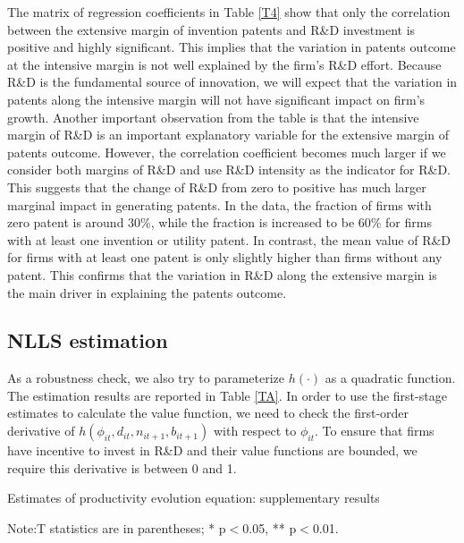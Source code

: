 \documentclass[English]{article}
\begin{document}
The matrix of regression coefficients in Table \ref{T4} show that only the correlation between the extensive margin of invention patents and R\&D investment is positive and highly significant. This implies that the variation in patents outcome at the intensive margin is not well explained by the firm's R\&D effort. Because R\&D is the fundamental source of innovation, we will expect that the variation in patents along the intensive margin will not have significant impact on firm's growth. Another important observation from the table is that the intensive margin of R\&D is an important explanatory variable for the extensive margin of patents outcome. However, the correlation coefficient becomes much larger if we consider both margins of R\&D and use R\&D intensity as the indicator for R\&D. This suggests that the change of R\&D from zero to positive has much larger marginal impact in generating patents. In the data, the fraction of firms with zero patent is around 30\%, while the fraction is increased to be 60\% for firms with at least one invention or utility patent. In contrast, the mean value of R\&D for firms with at least one patent is only slightly higher than firms without any patent. This confirms that the variation in R\&D along the extensive margin is the main driver in explaining the patents outcome. 


\subsection{NLLS estimation} \label{appc2}
As a robustness check, we also try to parameterize $h(\cdot)$ as a quadratic function. The estimation results are reported in Table \ref{TA}. In order to use the first-stage estimates to calculate the value function, we need to check the first-order derivative of $h(\phi_{it},d_{it},n_{it+1},b_{it+1})$ with respect to $\phi_{it}$. To ensure that firms have incentive to invest in R\&D and their value functions are bounded, we require this derivative is between 0 and 1. 

\begin{table}[H]

\centering
\caption{Estimates of productivity evolution equation: supplementary results}
\label{TA}

\caption*{\small{}Note:T statistics are in parentheses; {*} p$<$0.05, {*}{*}
p$<$0.01. }{\small \par}
\end{table}
\end{document}
